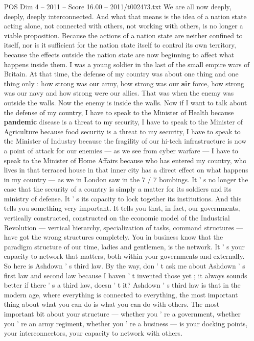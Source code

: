 \begin{textsample}{POS Dim 4 – 2011 – Score 16.00 – 2011/t002473.txt}
We are all now deeply, deeply, deeply interconnected.
And what that means is the idea of a nation state acting alone, not connected with others, not working with others, is no longer a viable proposition.
Because the actions of a nation state are neither confined to itself, nor is it sufficient for the nation state itself to control its own territory, because the effects outside the nation state are now beginning to affect what happens inside them.
I was a young soldier in the last of the small empire wars of Britain.
At that time, the defense of my country was about one thing and one thing only : how strong was our army, how strong was our \textbf{air} force, how strong was our navy and how strong were our allies.
That was when the enemy was outside the walls.
Now the enemy is inside the walls.
Now if I want to talk about the defense of my country, I have to speak to the Minister of Health because \textbf{pandemic} disease is a threat to my security, I have to speak to the Minister of Agriculture because food security is a threat to my security, I have to speak to the Minister of Industry because the fragility of our hi-tech infrastructure is now a point of attack for our enemies — as we see from cyber warfare — I have to speak to the Minister of Home Affairs because who has entered my country, who lives in that terraced house in that inner city has a direct effect on what happens in my country — as we in London saw in the 7 / 7 bombings.
It ' s no longer the case that the security of a country is simply a matter for its soldiers and its ministry of defense.
It ' s its capacity to lock together its institutions.
And this tells you something very important.
It tells you that, in fact, our governments, vertically constructed, constructed on the economic model of the Industrial Revolution — vertical hierarchy, specialization of tasks, command structures — have got the wrong structures completely.
You in business know that the paradigm structure of our time, ladies and gentlemen, is the network.
It ' s your capacity to network that matters, both within your governments and externally.
So here is Ashdown ' s third law.
By the way, don ' t ask me about Ashdown ' s first law and second law because I haven ' t invented those yet ; it always sounds better if there ' s a third law, doesn ' t it?
Ashdown ' s third law is that in the modern age, where everything is connected to everything, the most important thing about what you can do is what you can do with others.
The most important bit about your structure — whether you ' re a government, whether you ' re an army regiment, whether you ' re a business — is your docking points, your interconnectors, your capacity to network with others.

\end{textsample}

